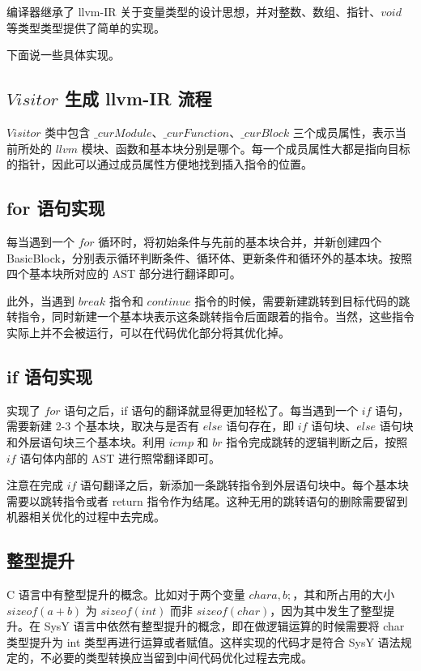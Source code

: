 \documentclass[a4paper]{article}
\begin{document}
		编译器继承了 llvm-IR 关于变量类型的设计思想，并对整数、数组、指针、$void$ 等类型类型提供了简单的实现。
		
		下面说一些具体实现。
		
		\subsection{$Visitor$ 生成 llvm-IR 流程}
		
			$Visitor$ 类中包含 $\_curModule$、$\_curFunction$、$\_curBlock$ 三个成员属性，表示当前所处的 $llvm$ 模块、函数和基本块分别是哪个。每一个成员属性大都是指向目标的指针，因此可以通过成员属性方便地找到插入指令的位置。
		
		\subsection{for 语句实现}
		
			每当遇到一个 $for$ 循环时，将初始条件与先前的基本块合并，并新创建四个 BasicBlock，分别表示循环判断条件、循环体、更新条件和循环外的基本块。按照四个基本块所对应的 AST 部分进行翻译即可。
			
			此外，当遇到 $break$ 指令和 $continue$ 指令的时候，需要新建跳转到目标代码的跳转指令，同时新建一个基本块表示这条跳转指令后面跟着的指令。当然，这些指令实际上并不会被运行，可以在代码优化部分将其优化掉。
			
		\subsection{if 语句实现}
		
			实现了 $for$ 语句之后，if 语句的翻译就显得更加轻松了。每当遇到一个 $if$ 语句，需要新建 2-3 个基本块，取决与是否有 $else$ 语句存在，即 $if$ 语句块、$else$ 语句块和外层语句块三个基本块。利用 $icmp$ 和 $br$ 指令完成跳转的逻辑判断之后，按照 $if$ 语句体内部的 AST 进行照常翻译即可。
			
			注意在完成 $if$ 语句翻译之后，新添加一条跳转指令到外层语句块中。每个基本块需要以跳转指令或者 return 指令作为结尾。这种无用的跳转语句的删除需要留到机器相关优化的过程中去完成。
			
		\subsection{整型提升}
			
			C 语言中有整型提升的概念。比如对于两个变量 $char a, b;$，其和所占用的大小 $sizeof(a+b)$ 为 $sizeof(int)$ 而非 $sizeof(char)$，因为其中发生了整型提升。在 SysY 语言中依然有整型提升的概念，即在做逻辑运算的时候需要将 char 类型提升为 int 类型再进行运算或者赋值。这样实现的代码才是符合 SysY 语法规定的，不必要的类型转换应当留到中间代码优化过程去完成。
			
\end{document}
